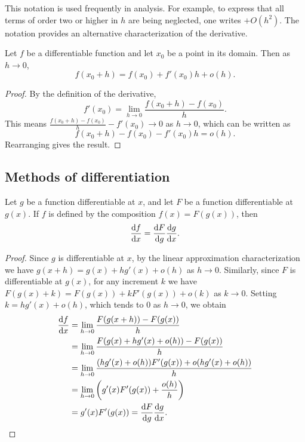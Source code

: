 \documentclass[a4paper]{article}
\begin{document}
This notation is used frequently in analysis. For example, to express that all terms of order two or higher in $h$ are being neglected, one writes $+O(h^2)$. The notation provides an alternative characterization of the derivative.
\begin{prop}
  Let $f$ be a differentiable function and let $x_0$ be a point in its domain. Then as $h \to 0$,
  \[
    f(x_0 + h) = f(x_0) + f'(x_0)h + o(h).
  \]
\end{prop}

\begin{proof}
  By the definition of the derivative,
  \[
    f'(x_0) = \lim_{h\to 0}\frac{f(x_0 + h) - f(x_0)}{h}.
  \]
  This means $\frac{f(x_0 + h) - f(x_0)}{h} - f'(x_0) \to 0$ as $h \to 0$, which can be written as
  \[
    f(x_0 + h) - f(x_0) - f'(x_0)h = o(h).
  \]
  Rearranging gives the result.
\end{proof}

\subsection{Methods of differentiation}
\begin{thm}
  Let $g$ be a function differentiable at $x$, and let $F$ be a function differentiable at $g(x)$. If $f$ is defined by the composition $f(x) = F(g(x))$, then
  \[
    \frac{\mathrm{d} f}{\mathrm{d} x} = \frac{\mathrm{d} F}{\mathrm{d} g}\frac{\mathrm{d} g}{\mathrm{d} x}.
  \]
\end{thm}

\begin{proof}
  Since $g$ is differentiable at $x$, by the linear approximation characterization we have $g(x + h) = g(x) + hg'(x) + o(h)$ as $h \to 0$. Similarly, since $F$ is differentiable at $g(x)$, for any increment $k$ we have $F(g(x) + k) = F(g(x)) + kF'(g(x)) + o(k)$ as $k \to 0$. Setting $k = hg'(x) + o(h)$, which tends to $0$ as $h \to 0$, we obtain
  \begin{align*}
    \frac{\mathrm{d} f}{\mathrm{d} x} &= \lim_{h\to 0}\frac{F(g(x + h)) - F(g(x))}{h}\\
    &= \lim_{h\to 0}\frac{F(g(x) + hg'(x) + o(h)) - F(g(x))}{h}\\
    &= \lim_{h\to 0}\frac{(hg'(x) + o(h))F'(g(x)) + o(hg'(x) + o(h))}{h}\\
    &= \lim_{h\to 0}\left(g'(x)F'(g(x)) + \frac{o(h)}{h}\right)\\
    &= g'(x)F'(g(x)) = \frac{\mathrm{d} F}{\mathrm{d} g}\frac{\mathrm{d} g}{\mathrm{d} x}.\qedhere
  \end{align*}
\end{proof}
\end{document}
